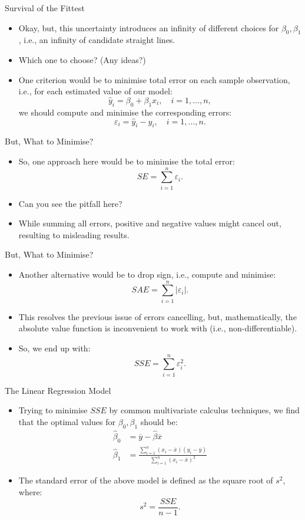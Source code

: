 \documentclass[aspectratio=169, 12pt, xcolor=table]{beamer}
\begin{document}
	\begin{frame}{Survival of the Fittest}
		\begin{itemize}
			\item Okay, but, this uncertainty introduces an infinity of different choices for $\beta_0,\beta_1$, i.e., an infinity of candidate straight lines.
			\item Which one to choose? (Any ideas?)\pause
			\item One criterion would be to minimise total error on each sample observation, i.e., for each estimated value of our model:
			\[\hat{y}_i=\beta_0+\beta_1x_i,\quad i=1,\ldots,n,\]
			we should compute and minimise the corresponding errors:
			\[\varepsilon_i=\hat{y}_i-y_i,\quad i=1,\ldots,n.\]
		\end{itemize}
	\end{frame}

	\begin{frame}{But, What to Minimise?}
		\begin{itemize}
			\item So, one approach here would be to minimise the total error:
			\[SE=\sum_{i=1}^n\varepsilon_i.\]
			\item Can you see the pitfall here?\pause
			\item While summing all errors, positive and negative values might cancel out, resulting to misleading results.
		\end{itemize}
	\end{frame}

	\begin{frame}{But, What to Minimise?}
		\begin{itemize}
			\item Another alternative would be to drop sign, i.e., compute and minimise:
			\[SAE=\sum_{i=1}^n\left|\varepsilon_i\right|.\]
			\item This resolves the previous issue of errors cancelling, but, mathematically, the absolute value function is inconvenient to work with (i.e., non-differentiable).
			\item So, we end up with:
			\[\boxed{SSE=\sum_{i=1}^n\varepsilon_i^2.}\]
		\end{itemize}
	\end{frame}


	\begin{frame}{The Linear Regression Model}
		\begin{itemize}
			\item Trying to minimise $SSE$ by common multivariate calculus techniques, we find that the optimal values for $\beta_0,\beta_1$ should be:
			\begin{align*}
				\hat{\beta}_0&=\overline{y}-\hat{\beta}\overline{x}\\
				\hat{\beta}_1&=\frac{\sum_{i=1}^n(x_i-\overline{x})(y_i-\overline{y})}{\sum_{i=1}^n(x_i-\overline{x})^2}
			\end{align*}
			\item The standard error of the above model is defined as the square root of $s^2$, where:
			\[s^2=\frac{SSE}{n-1}.\]
		\end{itemize}
	\end{frame}
\end{document}
